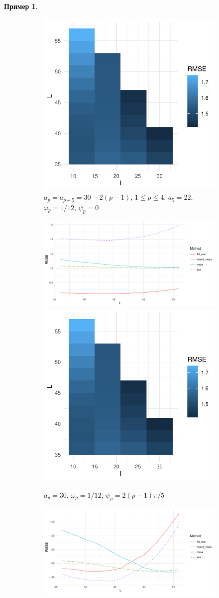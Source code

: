 \documentclass[specialist,
    substylefile = spbu_report.rtx,
    subf,href,colorlinks=true, 12pt]{disser}
\theoremstyle{plain}
\theoremstyle{definition}
\newtheorem{example}{Пример}[section]
\theoremstyle{remark}
\begin{document}
\begin{example}
\begin{figure}
\begin{subfigure}{.95\linewidth}
                \includegraphics[width=.34\linewidth]{nine-series-second_hooi}
                \caption{$a_{p} = a_{p+5} = 30 - 2(p-1)$, $1 \leqslant p \leqslant 4$,
                    $a_5=22$, $\omega_p=1/12$, $\psi_p=0$}
            \end{subfigure} \par\medskip
            \begin{subfigure}{.95\linewidth}
                \includegraphics[width=.66\linewidth]{nine-series-third}\hfill
                \includegraphics[width=.34\linewidth]{nine-series-third_hooi}
                \caption{$a_p = 30$, $\omega_p=1/12$, $\psi_p=2(p-1)\pi/5$}
            \end{subfigure} \par\medskip
            \begin{subfigure}{.95\linewidth}
                \includegraphics[width=.66\linewidth]{nine-series-fourth}\hfill

\end{subfigure}
\end{figure}
\end{example}
\end{document}
